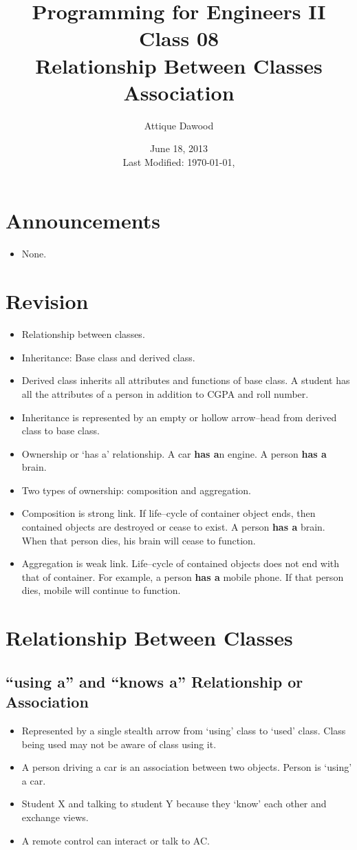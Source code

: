 \documentclass[12pt,a4paper]{article}
\title{\vspace{-2cm}Programming for Engineers II\\Class 08\\Relationship Between Classes\\Association}
\author{Attique Dawood}
\date{June 18, 2013\\[0.2cm] Last Modified: \today, \currenttime}
\begin{document}
\maketitle
\section{Announcements}
\begin{itemize}
\item None.
\end{itemize}
\section{Revision}
\begin{itemize}
\item Relationship between classes.
\item Inheritance: Base class and derived class.
\item Derived class inherits all attributes and functions of base class. A student has all the attributes of a person in addition to CGPA and roll number.
\item Inheritance is represented by an empty or hollow arrow--head from derived class to base class.
\item Ownership or `has a' relationship. A car \textbf{has a}n engine. A person \textbf{has a} brain.
\item Two types of ownership: composition and aggregation.
\item Composition is strong link. If life--cycle of container object ends, then contained objects are destroyed or cease to exist. A person \textbf{has a} brain. When that person dies, his brain will cease to function.
\item Aggregation is weak link. Life--cycle of contained objects does not end with that of container. For example, a person \textbf{has a} mobile phone. If that person dies, mobile will continue to function.
\end{itemize}
\section{Relationship Between Classes}
\subsection{``using a'' and ``knows a'' Relationship or Association}
\begin{itemize}
\item Represented by a single stealth arrow from `using' class to `used' class. Class being used may not be aware of class using it.
\item A person driving a car is an association between two objects. Person is `using' a car.
\item Student X and talking to student Y because they `know' each other and exchange views.
\item A remote control can interact or talk to AC.
\end{itemize}
\nocite{*}


\end{document}
